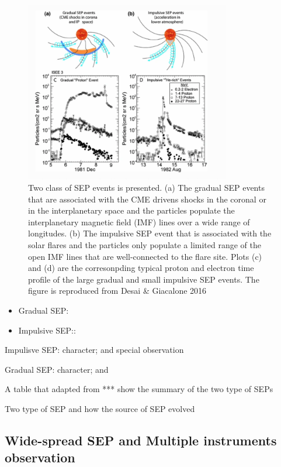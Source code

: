 \begin{figure}
	\centering
	\includegraphics[width = 0.8\textwidth]{images/SEP_two_type.png}
	\caption[Two type of Solar energetic particle (SEP) event]{Two class of SEP events is presented. (a) The gradual SEP events that are associated with the CME drivens shocks in the coronal or in the interplanetary space and the particles populate the interplanetary magnetic field (IMF) lines over a wide range of longitudes. (b) The impulsive SEP event that is associated with the solar flares and the particles only populate a limited range of the open IMF lines that are well-connected to the flare site. Plots (c) and (d) are the corresonpding typical proton and electron time profile of the large gradual and small impulsive SEP events. The figure is reproduced from Desai \& Giacalone 2016}
	\label{Fig:two_type_SEP}
\end{figure}

\begin{itemize}
	\item Gradual SEP:
	\item Impulsive SEP::
\end{itemize}
Impulisve SEP: character; and special observation 

Gradual SEP: character; and 

A table that adapted from *** show the summary of the two type of SEPs

Two type of SEP and how the source of SEP evolved


\subsection{Wide-spread SEP and Multiple instruments observation}

